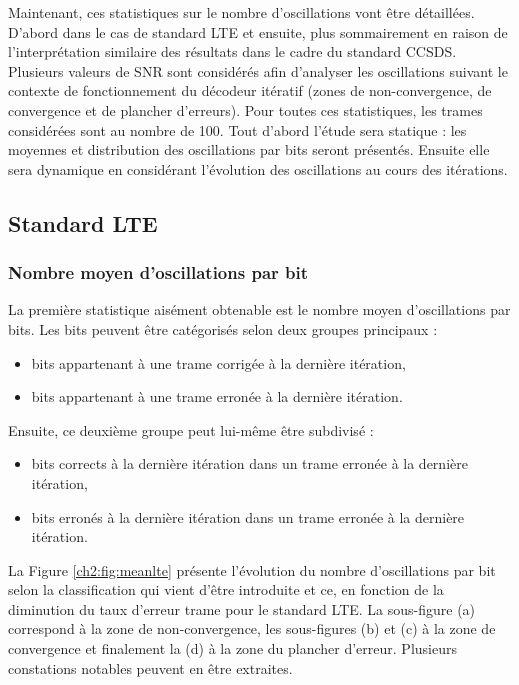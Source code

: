 Maintenant, ces statistiques sur le nombre d'oscillations vont être détaillées. D'abord dans le cas de standard LTE et 
ensuite, plus sommairement en raison de l'interprétation similaire des résultats dans le cadre du standard CCSDS. 
Plusieurs valeurs de SNR sont considérés afin d'analyser les oscillations suivant le contexte de fonctionnement du 
décodeur itératif (zones de non-convergence, de convergence et de plancher d'erreurs). Pour toutes ces statistiques, les 
trames considérées sont au nombre de 100. Tout d'abord l'étude sera statique : les moyennes et distribution des 
oscillations par bits seront présentés. Ensuite elle sera dynamique en considérant l'évolution des oscillations au cours 
des itérations.

\subsection{Standard LTE}
\subsubsection{Nombre moyen d'oscillations par bit}
La première statistique aisément obtenable est le nombre moyen d'oscillations par bits. Les bits peuvent être 
catégorisés selon deux groupes principaux :
\begin{itemize}
	\item bits appartenant à une trame corrigée à la dernière itération,
	\item bits appartenant à une trame erronée à la dernière itération.\newline
\end{itemize}
Ensuite, ce deuxième groupe peut lui-même être subdivisé :
\begin{itemize}
	\item bits corrects à la dernière itération dans un trame erronée à la dernière itération,
	\item bits erronés à la dernière itération dans un trame erronée à la dernière itération. \newline
\end{itemize}
La Figure \ref{ch2:fig:meanlte} présente l'évolution du nombre d'oscillations par bit selon la classification qui 
vient d'être introduite et ce, en fonction de la diminution du taux d'erreur trame pour le standard LTE. La sous-figure 
(a) correspond à la zone de non-convergence, les sous-figures (b) et (c) à la zone de convergence et finalement la (d) à 
la zone du plancher d'erreur. Plusieurs constations notables peuvent en être extraites. 


